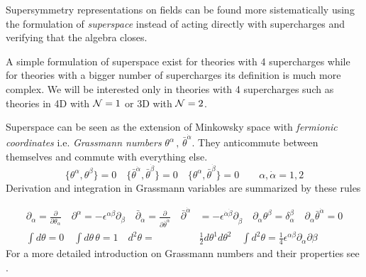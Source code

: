 \begin{appendices}
Supersymmetry representations on fields can be found more sistematically using the formulation of \emph{superspace} instead of acting directly with supercharges and verifying that the algebra closes.

A simple formulation of superspace exist for theories with 4 supercharges while for theories with a bigger number of supercharges its definition is much more complex. 
We will be interested only in theories with 4 supercharges such as theories in 4D with $\mathcal{N}=1$ or 3D with $\mathcal{N}=2$.

Superspace can be seen as the extension of Minkowsky space with \emph{fermionic coordinates} i.e. \emph{Grassmann numbers} $\theta^{\alpha} \, , \, \bar{\theta}^{\dot{\alpha}}$.
They anticommute between themselves and commute with everything else.
\begin{equation}
 \{ \theta^{\alpha} , \theta^{\beta} \} = 0 \quad  \{ \bar{\theta}^{\dot{\alpha}} , \bar{\theta}^{\dot{\beta}} \} = 0 \quad \{   \theta^{\alpha}  , \bar{\theta}^{\dot{\beta}}\} = 0 \qquad \alpha,\dot{\alpha} = 1,2
\end{equation}
Derivation and integration in Grassmann variables are summarized by these rules 

\begin{align}
 \partial_{\alpha} = \frac{\partial}{\partial \theta_{\alpha}} \quad 
 \partial^{\alpha} = -\epsilon^{\alpha \beta} \partial_{\beta} \quad
 \bar{\partial}_{\dot{\alpha}} =  \frac{\partial}{\partial \bar{\theta}^{\dot{\alpha}}} \quad 
 \bar{\partial}^{\dot{\alpha}} &= -\epsilon^{\dot{\alpha}  \dot{\beta}} \partial_{\dot{\beta}} 
\quad
 \partial_{\alpha} \theta^{\beta} = \delta^{\beta}_{\alpha} \quad
 \partial_{\alpha} \bar{\theta}^{\dot{\alpha}} = 0
 \\
 \int d \theta  = 0 \quad \int d \theta \, \theta = 1 \quad d^2\theta = & \frac{1}{2} d \theta^1 
  d \theta^2 \quad \int d^2 \theta = \frac{1}{4} \epsilon^{\alpha \beta } \partial_{\alpha} \partial{\beta}
\end{align}
For a more detailed introduction on Grassmann numbers and their properties see \cite{Bilal:2001nv}.


\end{appendices}
